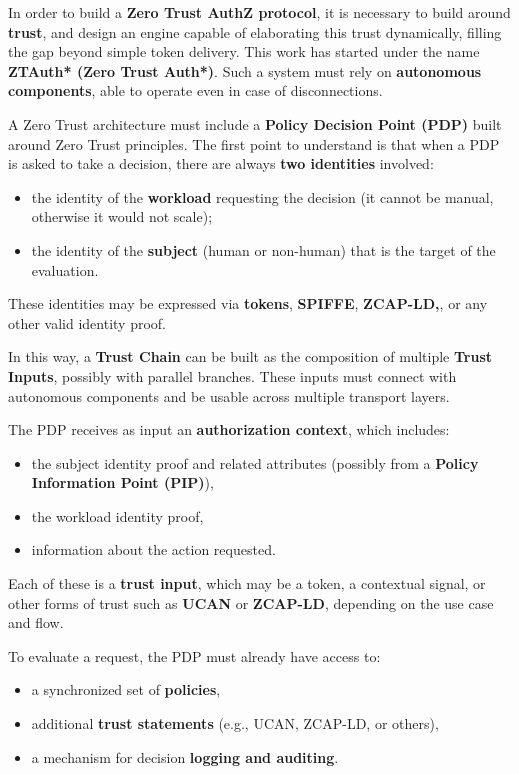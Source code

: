 In order to build a \textbf{Zero Trust AuthZ protocol}, it is necessary to build around \textbf{trust}, 
and design an engine capable of elaborating this trust dynamically, filling the gap beyond simple token delivery.  
This work has started under the name \textbf{ZTAuth* (Zero Trust Auth*)}.  
Such a system must rely on \textbf{autonomous components}, able to operate even in case of disconnections.  

\vspace{0.5em}  
A Zero Trust architecture must include a \textbf{Policy Decision Point (PDP)} built around Zero Trust principles.  
The first point to understand is that when a PDP is asked to take a decision, there are always \textbf{two identities} involved:
\begin{itemize}
    \item the identity of the \textbf{workload} requesting the decision (it cannot be manual, otherwise it would not scale);
    \item the identity of the \textbf{subject} (human or non-human) that is the target of the evaluation.
\end{itemize}
These identities may be expressed via \textbf{tokens}, \textbf{SPIFFE}, \textbf{ZCAP-LD,}, or any other valid identity proof.  

\vspace{0.5em}  
In this way, a \textbf{Trust Chain} can be built as the composition of multiple \textbf{Trust Inputs}, 
possibly with parallel branches. These inputs must connect with autonomous components 
and be usable across multiple transport layers.

The PDP receives as input an \textbf{authorization context}, which includes:
\begin{itemize}
    \item the subject identity proof and related attributes (possibly from a \textbf{Policy Information Point (PIP)}),
    \item the workload identity proof,
    \item information about the action requested.
\end{itemize}
Each of these is a \textbf{trust input}, which may be a token, a contextual signal, or other forms of trust such as \textbf{UCAN} or \textbf{ZCAP-LD}, depending on the use case and flow.  

\vspace{0.5em}  
To evaluate a request, the PDP must already have access to:
\begin{itemize}
    \item a synchronized set of \textbf{policies},
    \item additional \textbf{trust statements} (e.g., UCAN, ZCAP-LD, or others),
    \item a mechanism for decision \textbf{logging and auditing}.
\end{itemize}

